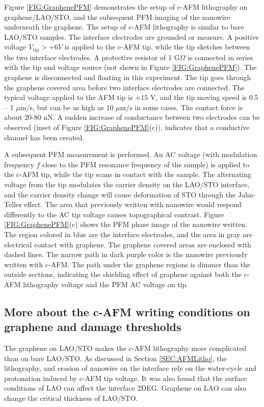 \documentclass[pdflatex, sectionletters, 12pt]{pittetd}    %
\begin{document}
Figure \ref{FIG:GraphenePFM} demonstrates the setup of c-AFM lithography on graphene/LAO/STO, and the subsequent PFM imaging of the nanowire underneath the graphene. The setup of c-AFM lithography is similar to bare LAO/STO samples. The interface electrodes are grounded or measure. A positive voltage $V_\mathrm{tip} > +6V$ is applied to the c-AFM tip, while the tip sketches between the two interface electrodes. A protective resistor of 1 G$\Omega$ is connected in series with the tip and voltage source (not shown in Figure \ref{FIG:GraphenePFM}). The graphene is disconnected and floating in this experiment. The tip goes through the graphene covered area before two interface electrodes are connected. The typical voltage applied to the AFM tip is $+15$ V, and the tip moving speed is 0.5 -- 1 $\mu$m/s, but can be as high as 10 $\mu$m/s in some cases. The contact force is about 20-80 nN. A sudden increase of conductance between two electrodes can be observed (inset of Figure \ref{FIG:GraphenePFM}(c)), indicates that a conductive channel has been created. 

A subsequent PFM measurement is performed. An AC voltage (with modulation frequency $f$ close to the PFM resonance frequency of the sample) is applied to the c-AFM tip, while the tip scans in contact with the sample. The alternating voltage from the tip modulates the carrier density on the LAO/STO interface, and the carrier density change will cause deformation of STO through the Jahn-Teller effect\cite{vonk2007interface, salluzzo2009orbital, park2006charge}. The area that previously written with nanowire would respond differently to the AC tip voltage causes topographical contrast\cite{huang2013direct}. Figure \ref{FIG:GraphenePFM}(c) shows the PFM phase image of the nanowire written. The region colored in blue are the interface electrodes, and the area in gray are electrical contact with graphene. The graphene covered areas are enclosed with dashed lines. The narrow path in dark purple color is the nanowire previously written with c-AFM. The path under the graphene regions is dimmer than the outside sections, indicating the shielding effect of graphene against both the c-AFM lithography voltage and the PFM AC voltage on tip.


\subsection{More about the c-AFM writing conditions on graphene and damage thresholds}

The graphene on LAO/STO makes the c-AFM lithography more complicated than on bare LAO/STO. As discussed in Section \ref{SEC:AFMLitho}, the lithography, and erasion of nanowire on the interface rely on the water-cycle and protonation induced by c-AFM tip voltage. It was also found that the surface conditions of LAO can affect the interface 2DEG\cite{brown2016giant, xie2011control, xie2013enhancing}. Graphene on LAO can also change the critical thickness of LAO/STO\cite{aliaj2018probing}. 
\\
\end{document}
